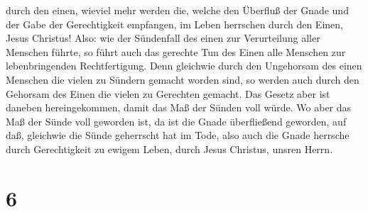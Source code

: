 durch den einen, wieviel mehr werden die, welche den Überfluß der Gnade
und der Gabe der Gerechtigkeit empfangen, im Leben herrschen durch den
Einen, Jesus Christus!  Also: wie der Sündenfall des
einen zur Verurteilung aller Menschen führte, so führt auch das gerechte
Tun des Einen alle Menschen zur lebenbringenden Rechtfertigung.
 Denn gleichwie durch den Ungehorsam des einen Menschen
die vielen zu Sündern gemacht worden sind, so werden auch durch den
Gehorsam des Einen die vielen zu Gerechten gemacht.  Das
Gesetz aber ist daneben hereingekommen, damit das Maß der Sünden voll
würde. Wo aber das Maß der Sünde voll geworden ist, da ist die Gnade
überfließend geworden,  auf daß, gleichwie die Sünde
geherrscht hat im Tode, also auch die Gnade herrsche durch Gerechtigkeit
zu ewigem Leben, durch Jesus Christus, unsren Herrn.

\hypertarget{section-5}{%
\section{6}\label{section-5}}

